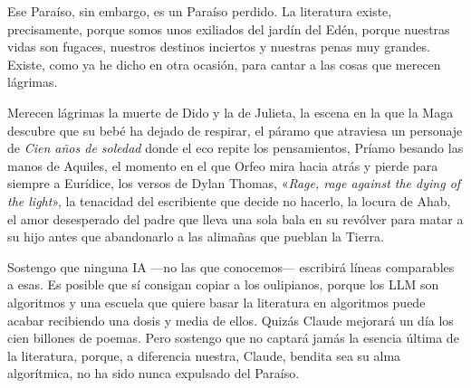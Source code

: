 \documentclass[11pt,a4paper]{article}
\begin{document}
%
%
%

Ese Paraíso, sin embargo, es un Paraíso perdido. La literatura existe, precisamente, porque somos unos exiliados del jardín del Edén, porque nuestras vidas son fugaces, nuestros destinos inciertos y nuestras penas muy grandes. Existe, como ya he dicho en otra ocasión, para cantar a las cosas que merecen lágrimas. 

Merecen lágrimas la muerte de Dido y la de Julieta, la escena en la que la Maga descubre que su bebé ha dejado de respirar, el páramo que atraviesa un personaje de \emph{Cien años de soledad} donde el eco repite los pensamientos, Príamo besando las manos de Aquiles, el momento en el que Orfeo mira hacia atrás y pierde para siempre a Eurídice, los versos de Dylan Thomas, «\emph{Rage, rage against the dying of the light}», la tenacidad del escribiente que decide no hacerlo, la locura de Ahab, el amor desesperado del padre que lleva una sola bala en su revólver para matar a su hijo antes que abandonarlo a las alimañas que pueblan la Tierra.

Sostengo que ninguna IA ---no las que conocemos--- escribirá líneas comparables a esas. Es posible que sí consigan copiar a los oulipianos, porque los LLM son algoritmos y una escuela que quiere basar la literatura en algoritmos puede acabar recibiendo una dosis y media de ellos. Quizás Claude mejorará un día los cien billones de poemas. Pero sostengo que no captará jamás la esencia última de la literatura, porque, a diferencia nuestra, Claude, bendita sea su alma algorítmica, no ha sido nunca expulsado del Paraíso. 
\end{document}
